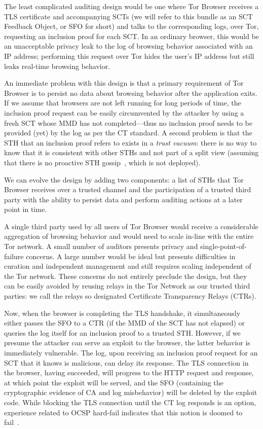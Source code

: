 The least complicated auditing design would be one where Tor Browser receives a
TLS certificate and accompanying SCTs (we will refer to this bundle as an SCT
Feedback Object, or SFO for short) and talks to the corresponding logs, over
Tor, requesting an inclusion proof for each SCT. In an ordinary browser, this
would be an unacceptable privacy leak to the log of browsing behavior associated
with an IP address; performing this request over Tor hides the user's IP address
but still leaks real-time browsing behavior.

An immediate problem with this design is that a primary requirement of Tor
Browser is to persist no data about browsing behavior after the application
exits. If we assume that browsers are not left running for long periods of time,
the inclusion proof request can be easily circumvented by the attacker by using
a fresh SCT whose MMD has not completed---thus no inclusion proof needs to be
provided (yet) by the log as per the CT standard. A second problem is that the
STH that an inclusion proof refers to exists in a \emph{trust vacuum}:
	there is no way to know that it is consistent with other STHs and not part
	of a split view (assuming that there is no proactive STH
	gossip~\cite{syta,dahlberg}, which is not deployed).

We can evolve the design by adding two components: a list of STHs that Tor
Browser receives over a trusted channel and the participation of a trusted third
party with the ability to persist data and perform auditing actions at a later
point in time.

A single third party used by all users of Tor Browser would receive a
considerable aggregation of browsing behavior and would need to scale in-line
with the entire Tor network. A small number of auditors presents privacy and
single-point-of-failure concerns. A large number would be ideal but presents
difficulties in curation and independent management and still requires scaling
independent of the Tor network. These concerns do not entirely preclude the
design, but they can be easily avoided by reusing relays in the Tor Network as
our trusted third parties: we call the relays so designated Certificate
Transparency Relays (CTRs).

Now, when the browser is completing the TLS handshake, it simultaneously either
passes the SFO to a CTR (if the MMD of the SCT has not elapsed) or queries the
log itself for an inclusion proof to a trusted STH\@.  However, if we presume
the attacker can serve an exploit to the browser, the latter behavior is
immediately vulnerable. The log, upon receiving an inclusion proof request for
an SCT that it knows is malicious, can delay its response. The TLS connection in
the browser, having succeeded, will progress to the HTTP request and response,
at which point the exploit will be served, and the SFO (containing the
cryptographic evidence of CA and log misbehavior) will be deleted by the exploit
code. While blocking the TLS connection until the CT log responds is an option,
experience related to OCSP hard-fail indicates that this notion is doomed to
fail~\cite{no-hard-fail}.

